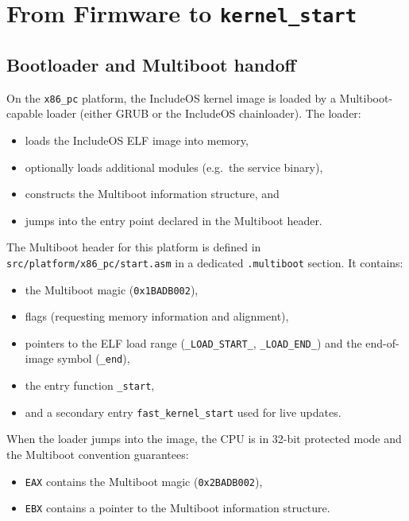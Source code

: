 \documentclass[a4paper,11pt]{article}
\begin{document}
\section{From Firmware to \texorpdfstring{\texttt{kernel\_start}}{kernel\_start}}

\subsection{Bootloader and Multiboot handoff}

On the \texttt{x86\_pc} platform, the IncludeOS kernel image is loaded by
a Multiboot-capable loader (either GRUB or the IncludeOS chainloader).
The loader:

\begin{itemize}
  \item loads the IncludeOS ELF image into memory,
  \item optionally loads additional modules (e.g.\ the service binary),
  \item constructs the Multiboot information structure, and
  \item jumps into the entry point declared in the Multiboot header.
\end{itemize}

The Multiboot header for this platform is defined in
\texttt{src/platform/x86\_pc/start.asm} in a dedicated
\texttt{.multiboot} section. It contains:

\begin{itemize}
  \item the Multiboot magic (\texttt{0x1BADB002}),
  \item flags (requesting memory information and alignment),
  \item pointers to the ELF load range (\texttt{\_LOAD\_START\_},
        \texttt{\_LOAD\_END\_}) and the end-of-image symbol
        (\texttt{\_end}),
  \item the entry function \texttt{\_start},
  \item and a secondary entry \texttt{fast\_kernel\_start} used for live
        updates.
\end{itemize}

When the loader jumps into the image, the CPU is in 32-bit protected
mode and the Multiboot convention guarantees:

\begin{itemize}
  \item \texttt{EAX} contains the Multiboot magic (\texttt{0x2BADB002}),
  \item \texttt{EBX} contains a pointer to the Multiboot information
        structure.
\end{itemize}
\end{document}

